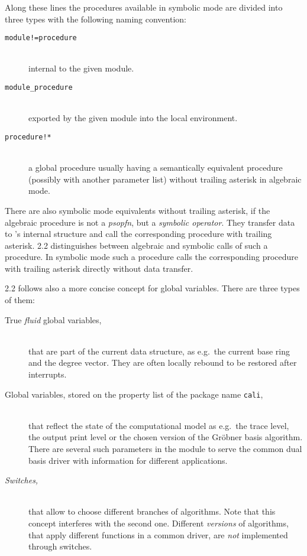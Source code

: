 Along these lines the  procedures available in symbolic mode are
divided into three types with the following naming convention:
\begin{description}
\item[\normalfont\texttt{module!=procedure}]\mbox{}\\
  internal to the given module.

\item[\normalfont\texttt{module\_procedure}]\mbox{}\\
  exported by the given module into the local  environment.

\item[\normalfont\texttt{procedure!*}]\mbox{}\\
  a global procedure usually having a semantically equivalent
procedure (possibly with another parameter list) without trailing
asterisk in algebraic mode.
\end{description}
There are also symbolic mode equivalents without trailing asterisk, if
the algebraic procedure is not a \emph{psopfn}, but a \emph{symbolic
operator}. They transfer data to 's internal structure and call
the corresponding procedure with trailing asterisk.  2.2
distinguishes between algebraic and symbolic calls of such a
procedure. In symbolic mode such a procedure calls the corresponding
procedure with trailing asterisk directly without data transfer.
\medskip

 2.2 follows also a more concise concept for global
variables. There are three types of them:
\begin{description}
\item[\normalfont True \emph{fluid} global variables,]\mbox{}\\
that are part of the current data structure, as e.g.\ the current
base ring and the degree vector. They are often locally rebound to be
restored after interrupts.

\item[\normalfont Global variables, stored on the property list of the package name \texttt{cali},]\mbox{}\\ 
that reflect the state of the computational model as e.g.\ the
trace level, the output print level or the chosen version of the Gr\"obner
basis algorithm. There are several such parameters in the module
 to serve the common dual basis driver with
information for different applications.

\item[\normalfont\emph{Switches,}]\mbox{}\\ 
that allow to choose different branches of algorithms. Note that
this concept interferes with the second one. Different \emph{versions}
of algorithms, that apply different functions in a common driver, are
\emph{not} implemented through switches.
\end{description}



